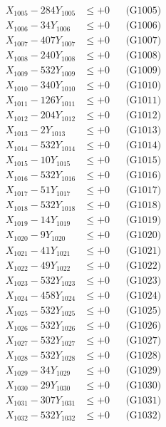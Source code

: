 \documentclass[a4paper,10pt]{article}
\begin{document}
{\begin{align}
X_{1005} - 284Y_{1005} &\leq +0 && \text{(G1005)} \\
X_{1006} - 34Y_{1006} &\leq +0 && \text{(G1006)} \\
X_{1007} - 407Y_{1007} &\leq +0 && \text{(G1007)} \\
X_{1008} - 240Y_{1008} &\leq +0 && \text{(G1008)} \\
X_{1009} - 532Y_{1009} &\leq +0 && \text{(G1009)} \\
X_{1010} - 340Y_{1010} &\leq +0 && \text{(G1010)} \\
\allowbreak
X_{1011} - 126Y_{1011} &\leq +0 && \text{(G1011)} \\
X_{1012} - 204Y_{1012} &\leq +0 && \text{(G1012)} \\
X_{1013} - 2Y_{1013} &\leq +0 && \text{(G1013)} \\
X_{1014} - 532Y_{1014} &\leq +0 && \text{(G1014)} \\
X_{1015} - 10Y_{1015} &\leq +0 && \text{(G1015)} \\
X_{1016} - 532Y_{1016} &\leq +0 && \text{(G1016)} \\
X_{1017} - 51Y_{1017} &\leq +0 && \text{(G1017)} \\
X_{1018} - 532Y_{1018} &\leq +0 && \text{(G1018)} \\
X_{1019} - 14Y_{1019} &\leq +0 && \text{(G1019)} \\
X_{1020} - 9Y_{1020} &\leq +0 && \text{(G1020)} \\
\allowbreak
X_{1021} - 41Y_{1021} &\leq +0 && \text{(G1021)} \\
X_{1022} - 49Y_{1022} &\leq +0 && \text{(G1022)} \\
X_{1023} - 532Y_{1023} &\leq +0 && \text{(G1023)} \\
X_{1024} - 458Y_{1024} &\leq +0 && \text{(G1024)} \\
X_{1025} - 532Y_{1025} &\leq +0 && \text{(G1025)} \\
X_{1026} - 532Y_{1026} &\leq +0 && \text{(G1026)} \\
X_{1027} - 532Y_{1027} &\leq +0 && \text{(G1027)} \\
X_{1028} - 532Y_{1028} &\leq +0 && \text{(G1028)} \\
X_{1029} - 34Y_{1029} &\leq +0 && \text{(G1029)} \\
X_{1030} - 29Y_{1030} &\leq +0 && \text{(G1030)} \\
\allowbreak
X_{1031} - 307Y_{1031} &\leq +0 && \text{(G1031)} \\
X_{1032} - 532Y_{1032} &\leq +0 && \text{(G1032)} \\

\end{align}}
\end{document}
